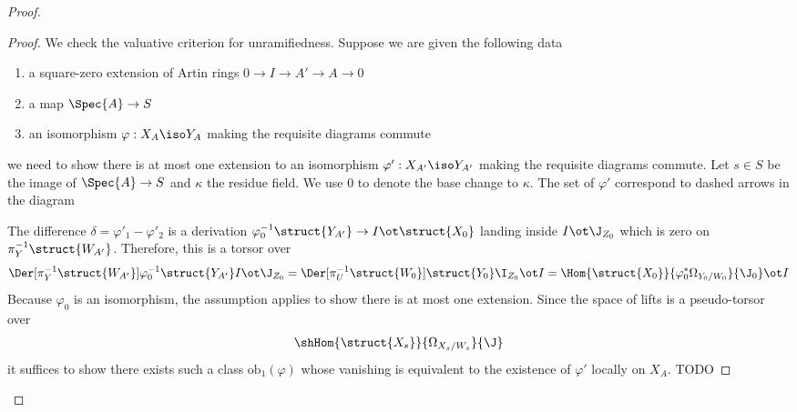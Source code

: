 \documentclass[12pt]{article}
\newcommand{\ob}{\mathrm{ob}}
\begin{document}
\begin{proof}
\begin{proof}
We check the valuative criterion for unramifiedness. Suppose we are given the following data
\begin{enumerate}
\item a square-zero extension of Artin rings $0 \to I \to A' \to A \to 0$
\item a map $\Spec{A} \to S$
\item an isomorphism $\varphi : X_A \iso Y_A$ making the requisite diagrams commute
\end{enumerate}
we need to show there is at most one extension to an isomorphism $\varphi' : X_{A'} \iso Y_{A'}$ making the requisite diagrams commute. Let $s \in S$ be the image of $\Spec{A} \to S$ and $\kappa$ the residue field. We use $0$ to denote the base change to $\kappa$. The set of $\varphi'$ correspond to dashed arrows in the diagram
\begin{center}
\end{center}
The difference $\delta = \varphi'_1 - \varphi'_2$ is a derivation $\varphi_0^{-1} \struct{Y_{A'}} \to I \ot \struct{X_0}$ landing inside $I \ot \J_{Z_0}$ which is zero on $\pi^{-1}_Y \struct{W_{A'}}$. Therefore, this is a torsor over
\[ \Der[\pi_Y^{-1} \struct{W_{A'}}]{\varphi_0^{-1} \struct{Y_{A'}}}{I \ot \J_{Z_0}} = \Der[\pi_U^{-1} \struct{W_0}]{\struct{Y_0}}{\I_{Z_0}} \ot I = \Hom{\struct{X_0}}{\varphi_0^{*} \Omega_{Y_0/W_0}}{\J_0} \ot I \]
Because $\varphi_0$ is an isomorphism, the assumption applies to show there is at most one extension. Since the space of lifts is a pseudo-torsor over
\[ \shHom{\struct{X_s}}{\Omega_{X_s/W_s}}{\J} \]
it suffices to show there exists such a class $\ob_1(\varphi)$ whose vanishing is equivalent to the existence of $\varphi'$ locally on $X_A$. {\color{red} TODO}
\end{proof}


\end{proof}
\end{document}
